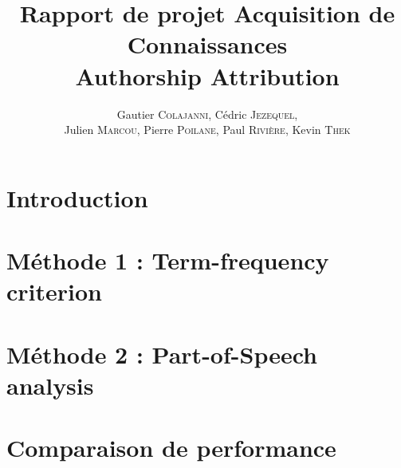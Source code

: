 \documentclass[a4paper]{article}
\author{Gautier \textsc{Colajanni}, Cédric \textsc{Jezequel},\\ Julien \textsc{Marcou}, Pierre \textsc{Poilane}, Paul \textsc{Rivière}, Kevin \textsc{Thek}}
\title{Rapport de projet Acquisition de Connaissances \\ Authorship Attribution}
\begin{document}
\maketitle

\section{Introduction}

\section{Méthode 1 : Term-frequency criterion}

\section{Méthode 2 : Part-of-Speech analysis}

\section{Comparaison de performance}
\end{document}

